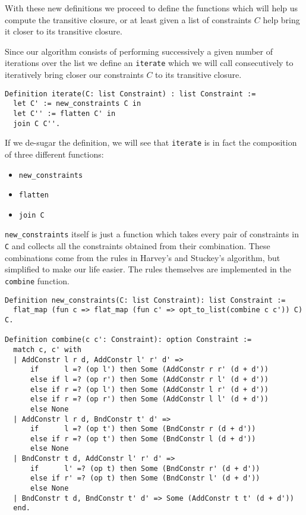 With these new definitions we proceed to define the functions which will help us 
compute the transitive closure, or at least given a list of constraints $C$ help bring
it closer to its transitive closure.

Since our algorithm consists of performing successively a given number of iterations
over the list we define an \texttt{iterate} which we will call consecutively to
iteratively bring closer our constraints $C$ to its transitive closure.

\begin{verbatim}
Definition iterate(C: list Constraint) : list Constraint :=
  let C' := new_constraints C in
  let C'' := flatten C' in
  join C C''.
\end{verbatim}

If we de-sugar the definition, we will see that \texttt{iterate} is in fact the composition of
three different functions: 

\begin{itemize}
    \item \texttt{new_constraints}
    \item \texttt{flatten}
    \item \texttt{join C}
\end{itemize}

\texttt{new_constraints} itself is just a function which takes every pair of constraints in 
\texttt{C} and collects all the constraints obtained from their combination.
These combinations come from the rules in Harvey's and Stuckey's algorithm, but 
simplified to make our life easier. The rules themselves are implemented in the 
\texttt{combine} function.

\begin{verbatim}
Definition new_constraints(C: list Constraint): list Constraint :=
  flat_map (fun c => flat_map (fun c' => opt_to_list(combine c c')) C) C.
  
Definition combine(c c': Constraint): option Constraint :=
  match c, c' with
  | AddConstr l r d, AddConstr l' r' d' =>
      if      l =? (op l') then Some (AddConstr r r' (d + d'))
      else if l =? (op r') then Some (AddConstr r l' (d + d'))
      else if r =? (op l') then Some (AddConstr l r' (d + d'))
      else if r =? (op r') then Some (AddConstr l l' (d + d'))
      else None
  | AddConstr l r d, BndConstr t' d' =>
      if      l =? (op t') then Some (BndConstr r (d + d'))
      else if r =? (op t') then Some (BndConstr l (d + d'))
      else None
  | BndConstr t d, AddConstr l' r' d' =>
      if      l' =? (op t) then Some (BndConstr r' (d + d'))
      else if r' =? (op t) then Some (BndConstr l' (d + d'))
      else None
  | BndConstr t d, BndConstr t' d' => Some (AddConstr t t' (d + d'))
  end.
\end{verbatim}

